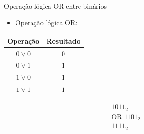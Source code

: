 

\begin{frame}{Operação lógica OR entre binários}
    \begin{itemize}
        \item Operação lógica OR:
    \end{itemize}

    \begin{table}[h]
        \centering
        \begin{tabular}{c|c}
            \hline
            \textbf{Operação} & \textbf{Resultado} \\
            \hline
            $0 \lor 0$ & $0$ \\
            $0 \lor 1$ & $1$ \\
            $1 \lor 0$ & $1$ \\
            $1 \lor 1$ & $1$ \\
            \hline
        \end{tabular}
    \end{table}

    \[
    \begin{array}{r}
        1011_{2} \\
        \text{OR }1101_{2} \\
        \hline
        1111_{2}
    \end{array}
    \]

\end{frame}
